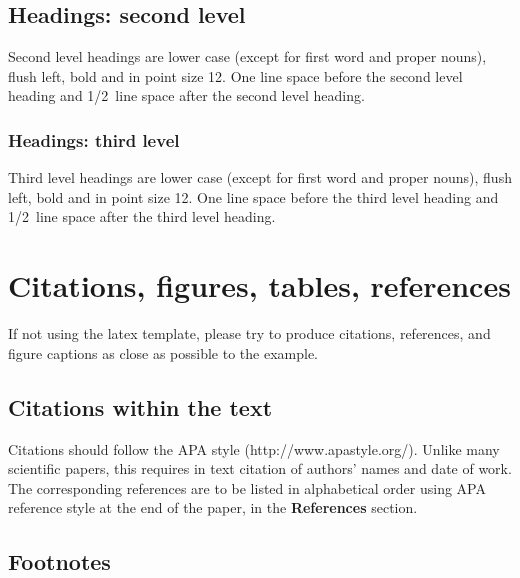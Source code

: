 \documentclass{article}
\begin{document}
\subsection{Headings: second level}

Second level headings are lower case (except for first word and
proper nouns), flush left, bold and in point size 12. One line space
before the second level heading and 1/2~line space after the second
level heading.

\subsubsection{Headings: third level}

Third level headings are lower case (except for first word and
proper nouns), flush left, bold and in point size 12. One line space
before the third level heading and 1/2~line space after the third
level heading.

\section{Citations, figures, tables, references}
\label{others}

If not using the  latex template, please try to produce citations,
references, and figure captions as close as possible to the example.

\subsection{Citations within the text}

Citations should follow the APA style (http://www.apastyle.org/). Unlike many
scientific papers, this requires in text citation of authors' names
and date of work. The corresponding references are to be listed in
alphabetical order using APA reference style at the end of the
paper, in the \textbf{References} section. 



\subsection{Footnotes}
\end{document}
